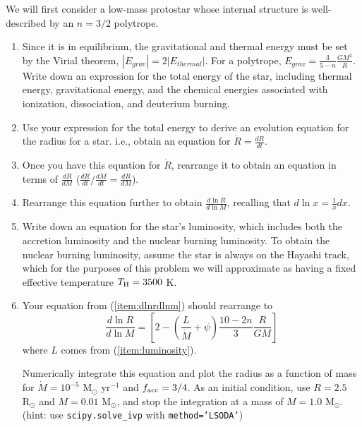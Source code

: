 \documentclass{article}
\newcommand{\msun}{\ensuremath{\mathrm{M}_\odot}\xspace}
\newcommand{\rsun}{\ensuremath{\mathrm{R}_\odot}\xspace}
\begin{document}
\begin{enumerate}
 We will first consider a low-mass protostar whose internal structure is
 well-described by an $n=3/2$ polytrope.


\begin{enumerate}
    \item 
 Since it is in equilibrium, the gravitational and thermal energy
 must be set by the Virial theorem, $|E_{grav}| =2 |E_{thermal}|$.
 For a polytrope, $E_{grav} = \frac{3}{5-n} \frac{G M^2}{R}$.
 Write down an expression for the total energy of the star,
 including thermal energy, gravitational energy, and the chemical energies
 associated with ionization, dissociation, and deuterium burning.
\item Use your expression for the total energy to derive an evolution equation
    for the radius for a star.  i.e., obtain an equation for $\dot{R}=\frac{dR}{dt}$.
\item Once you have this equation for $\dot{R}$, rearrange it to obtain an equation in terms
    of $\frac{dR}{dM}$ ($\frac{dR}{dt} / \frac{dM}{dt} = \frac{dR}{dM}$).
\item
    \label{item:dlnrdlnm}
    Rearrange this equation further to obtain $\frac{d \ln R}{d \ln M}$,
    recalling that $d \ln x = \frac{1}{x}dx$.
\item
    \label{item:luminosity}
    Write down an equation for the star's luminosity, which includes both the accretion 
    luminosity and the nuclear burning luminosity. 
    To obtain the nuclear burning luminosity,  assume the star is always on the Hayashi track,
    which for the purposes of this problem we will approximate as having a
    fixed effective temperature $T_{\rm H} = 3500$ K.
\item 
    Your equation from (\ref{item:dlnrdlnm}) should rearrange to
\begin{equation}
    \frac{d \ln R}{d \ln M} = \left[2 - \left(\frac{L}{\dot{M}}+\psi\right)\frac{10-2n}{3}\frac{R}{GM} \right]
\end{equation}
where $L$ comes from (\ref{item:luminosity}).

    Numerically integrate this equation and plot the radius as a function of
    mass for $\dot{M} = 10^{-5}$ $\msun$ yr$^{-1}$ and $f_{\rm acc}=3/4$. As an
    initial condition, use $R=2.5$ $\rsun$ and $M=0.01$ $\msun$, and stop the
    integration at a mass of $M=1.0$ $\msun$.
    (hint: use \texttt{scipy.solve\_ivp} with \texttt{method='LSODA'})


\end{enumerate}
\end{enumerate}
\end{document}
